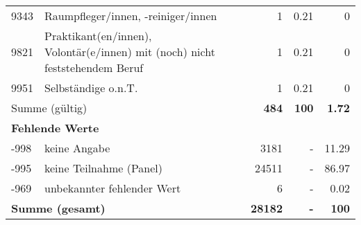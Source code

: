 \begin{longtable}{lXrrr}
        9343 & \multicolumn{1}{X}{Raumpfleger/innen, -reiniger/innen} & %
          \num{1} &
          \num[round-mode=places,round-precision=2]{0.21} &
          \num[round-mode=places,round-precision=2]{0} \\

        9821 & \multicolumn{1}{X}{Praktikant(en/innen), Volontär(e/innen) mit (noch) nicht feststehendem Beruf} & %
          \num{1} &
          \num[round-mode=places,round-precision=2]{0.21} &
          \num[round-mode=places,round-precision=2]{0} \\

        9951 & \multicolumn{1}{X}{Selbständige o.n.T.} & %
          \num{1} &
          \num[round-mode=places,round-precision=2]{0.21} &
          \num[round-mode=places,round-precision=2]{0} \\

     \midrule
     \multicolumn{2}{l}{Summe (gültig)} &
       \textbf{\num{484}} &
     \textbf{\num{100}} &
       \textbf{\num[round-mode=places,round-precision=2]{1.72}} \\
     \multicolumn{5}{l}{\textbf{Fehlende Werte}}\\
       -998 &
       keine Angabe &
         \num{3181} &
        - &
         \num[round-mode=places,round-precision=2]{11.29} \\
       -995 &
       keine Teilnahme (Panel) &
         \num{24511} &
        - &
         \num[round-mode=places,round-precision=2]{86.97} \\
       -969 &
       unbekannter fehlender Wert &
         \num{6} &
        - &
         \num[round-mode=places,round-precision=2]{0.02} \\
     \midrule
     \multicolumn{2}{l}{\textbf{Summe (gesamt)}} &
          \textbf{\num{28182}} &
        \textbf{-} &
        \textbf{\num{100}} \\
     \bottomrule
     \end{longtable}
     

